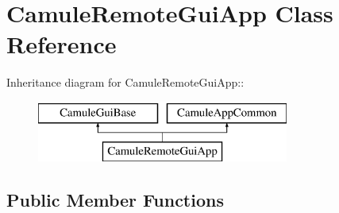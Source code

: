 \section{CamuleRemoteGuiApp Class Reference}
\label{classCamuleRemoteGuiApp}
Inheritance diagram for CamuleRemoteGuiApp::\begin{figure}[H]
\begin{center}
\leavevmode
\includegraphics[height=2cm]{classCamuleRemoteGuiApp}
\end{center}
\end{figure}
\subsection*{Public Member Functions}
